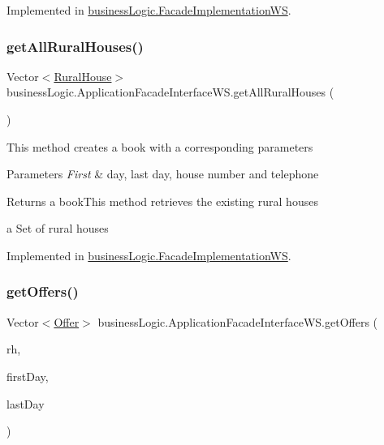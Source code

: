 Implemented in \mbox{\hyperlink{classbusiness_logic_1_1_facade_implementation_w_s_ac7b3bdfd0815ea7c787da312de594cce}{business\+Logic.\+Facade\+Implementation\+WS}}.

\mbox{\label{interfacebusiness_logic_1_1_application_facade_interface_w_s_a553cbfb37ea9f1621ba76ad8308a15da}} 
\subsubsection{\texorpdfstring{getAllRuralHouses()}{getAllRuralHouses()}}
{\footnotesize\ttfamily Vector$<$\mbox{\hyperlink{classdomain_1_1_rural_house}{Rural\+House}}$>$ business\+Logic.\+Application\+Facade\+Interface\+W\+S.\+get\+All\+Rural\+Houses (\begin{DoxyParamCaption}{ }\end{DoxyParamCaption})}

This method creates a book with a corresponding parameters


\begin{DoxyParams}{Parameters}
{\em First} & day, last day, house number and telephone \\
\hline
\end{DoxyParams}
\begin{DoxyReturn}{Returns}
a book\+This method retrieves the existing rural houses

a Set of rural houses 
\end{DoxyReturn}


Implemented in \mbox{\hyperlink{classbusiness_logic_1_1_facade_implementation_w_s_aa6f21ddb40ca6cd752a13e31ff016e7e}{business\+Logic.\+Facade\+Implementation\+WS}}.

\mbox{\label{interfacebusiness_logic_1_1_application_facade_interface_w_s_ae338a96d039003c64fceb68d667736f1}} 
\subsubsection{\texorpdfstring{getOffers()}{getOffers()}}
{\footnotesize\ttfamily Vector$<$\mbox{\hyperlink{classdomain_1_1_offer}{Offer}}$>$ business\+Logic.\+Application\+Facade\+Interface\+W\+S.\+get\+Offers (\begin{DoxyParamCaption}\item[{\mbox{\hyperlink{classdomain_1_1_rural_house}{Rural\+House}}}]{rh,  }\item[{Date}]{first\+Day,  }\item[{Date}]{last\+Day }\end{DoxyParamCaption})}

